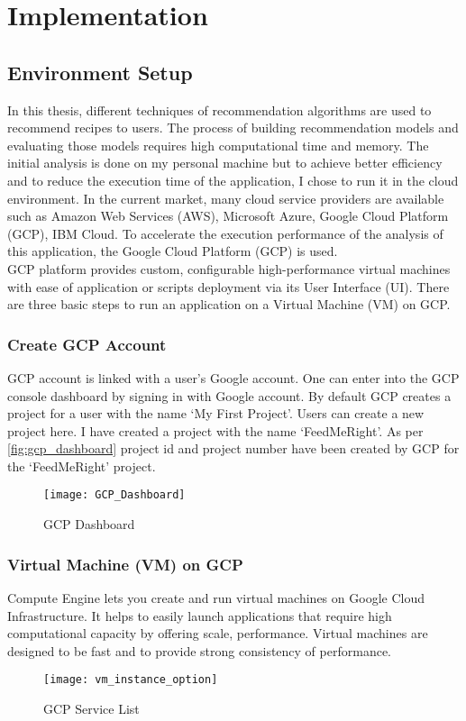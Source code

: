 \chapter{Implementation}
\label{ch:impl}
\section{Environment Setup}
In this thesis, different techniques of recommendation algorithms are used to recommend recipes to users. The process of building recommendation models and evaluating those models requires high computational time and memory. The initial analysis is done on my personal machine but to achieve better efficiency and to reduce the execution time of the application, I chose to run it in the cloud environment.  In the current market, many cloud service providers are available such as Amazon Web Services (AWS), Microsoft Azure, Google Cloud Platform (GCP), IBM Cloud. To accelerate the execution performance of the analysis of this application, the Google Cloud Platform (GCP) is used. \\
\noindent GCP platform provides custom, configurable high-performance virtual machines with ease of application or scripts deployment via its User Interface (UI). There are three basic steps to run an application on a Virtual Machine (VM) on GCP. 
\subsection{Create GCP Account}
GCP account is linked with a user's Google account. One can enter into the GCP console dashboard by signing in with Google account. By default GCP creates a project for a user with the name `My First Project'. Users can create a new project here. I have created a project with the name `FeedMeRight'. As per \autoref{fig:gcp_dashboard} project id and project number have been created by GCP for the `FeedMeRight' project. 
\begin{figure}[H]
	\centering
	\texttt{[image: GCP\_Dashboard]}
	\caption{GCP Dashboard}
	\label{fig:gcp_dashboard}
\end{figure}
  
\subsection{Virtual Machine (VM) on GCP}
Compute Engine lets you create and run virtual machines on Google Cloud Infrastructure. It helps to easily launch applications that require high computational capacity by offering scale, performance. Virtual machines are designed to be fast and to provide strong consistency of performance. 
\begin{figure}[H]
	\centering
	\texttt{[image: vm\_instance\_option]}
	\caption{GCP Service List}
	\label{fig:vm_instance_option}
\end{figure}

